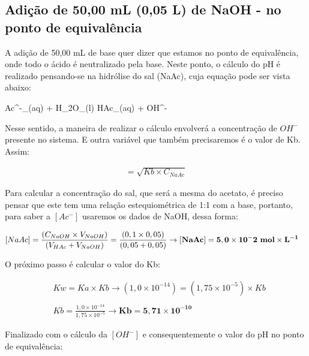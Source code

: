 \documentclass[a4paper, 12pt]{article}
\begin{document}
\subsection{Adição de 50,00 mL (0,05 L) de NaOH - no ponto de equivalência}
A adição de 50,00 mL de base quer dizer que estamos no ponto de equivalência, onde todo o ácido é neutralizado pela base. Neste ponto, o cálculo do pH é realizado pensando-se na hidrólise do sal (NaAc), cuja equação pode ser vista abaixo:

\begin{chemeqn}
	Ac^{-}_{(aq)} + H_{2}O_{(l)} \equilibarrow HAc_{(aq)} + OH^-{} 
\end{chemeqn}

Nesse sentido, a maneira de realizar o cálculo envolverá a concentração de $OH^{-}$ presente no sistema. E outra variável que também precisaremos é o valor de Kb. Assim:

\begin{fleqn}
	\begin{align*}
		[OH^{-}] = \sqrt{Kb \times C_{NaAc}}
	\end{align*}
\end{fleqn}

Para calcular a concentração do sal, que será a mesma do acetato, é preciso pensar que este tem uma relação estequiométrica de 1:1 com a base, portanto, para saber a $[Ac^{-}]$ usaremos os dados de NaOH, dessa forma:

\begin{fleqn}
	\begin{align*}
		&[NaAc] = \frac{ (C_{NaOH} \times V_{NaOH}) }{ (V_{HAc} + V_{NaOH}) } = \frac{ (0,1 \times 0,05) }{ (0,05 + 0,05) } \rightarrow \mathbf{[NaAc] = 5,0 \times 10^-2 \text{ \textbf{mol}} \times L^{-1}}
	\end{align*}
\end{fleqn}

O próximo passo é calcular o valor do Kb: 

\begin{fleqn}
	\begin{align*}
		&Kw = Ka \times Kb \rightarrow (1,0 \times 10^{-14}) = (1,75 \times 10^{-5}) \times Kb \\ \\
		&Kb = \frac{1,0 \times 10^{-14}}{1,75 \times 10^{-5}} \rightarrow \mathbf{Kb = 5,71 \times 10^{-10}}
	\end{align*}
\end{fleqn}

Finalizado com o cálculo da $[OH^{-}]$ e consequentemente o valor do pH no ponto de equivalência:
\end{document}
